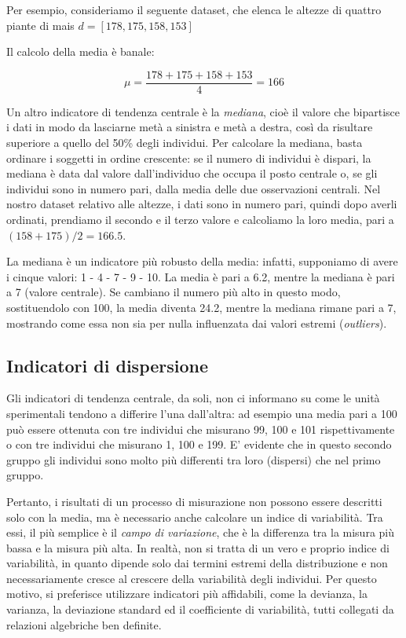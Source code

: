 \documentclass[a4paper,12pt,oneside]{book}
\begin{document}
Per esempio, consideriamo il seguente dataset, che elenca le altezze di quattro piante di mais \(d = [178, 175, 158, 153]\)

Il calcolo della media è banale:

\[\mu = \frac{178 + 175 + 158 + 153}{4} = 166\]

Un altro indicatore di tendenza centrale è la \emph{mediana}, cioè il valore che bipartisce i dati in modo da lasciarne metà a sinistra e metà a destra, così da risultare superiore a quello del 50\% degli individui. Per calcolare la mediana, basta ordinare i soggetti in ordine crescente: se il numero di individui è dispari, la mediana è data dal valore dall'individuo che occupa il posto centrale o, se gli individui sono in numero pari, dalla media delle due osservazioni centrali. Nel nostro dataset relativo alle altezze, i dati sono in numero pari, quindi dopo averli ordinati, prendiamo il secondo e il terzo valore e calcoliamo la loro media, pari a \((158 + 175)/2 = 166.5\).

La mediana è un indicatore più robusto della media: infatti, supponiamo di avere i cinque valori: 1 - 4 - 7 - 9 - 10. La media è pari a 6.2, mentre la mediana è pari a 7 (valore centrale). Se cambiano il numero più alto in questo modo, sostituendolo con 100, la media diventa 24.2, mentre la mediana rimane pari a 7, mostrando come essa non sia per nulla influenzata dai valori estremi (\emph{outliers}).

\hypertarget{indicatori-di-dispersione}{%
\subsection{Indicatori di dispersione}\label{indicatori-di-dispersione}}

Gli indicatori di tendenza centrale, da soli, non ci informano su come le unità sperimentali tendono a differire l'una dall'altra: ad esempio una media pari a 100 può essere ottenuta con tre individui che misurano 99, 100 e 101 rispettivamente o con tre individui che misurano 1, 100 e 199. E' evidente che in questo secondo gruppo gli individui sono molto più differenti tra loro (dispersi) che nel primo gruppo.

Pertanto, i risultati di un processo di misurazione non possono essere descritti solo con la media, ma è necessario anche calcolare un indice di variabilità. Tra essi, il più semplice è il \emph{campo di variazione}, che è la differenza tra la misura più bassa e la misura più alta. In realtà, non si tratta di un vero e proprio indice di variabilità, in quanto dipende solo dai termini estremi della distribuzione e non necessariamente cresce al crescere della variabilità degli individui. Per questo motivo, si preferisce utilizzare indicatori più affidabili, come la devianza, la varianza, la deviazione standard ed il coefficiente di variabilità, tutti collegati da relazioni algebriche ben definite.
\end{document}
